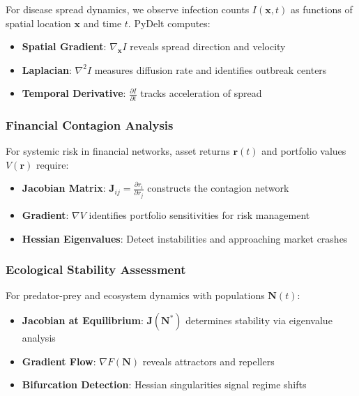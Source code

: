 \documentclass[10pt,journal,compsoc]{IEEEtran}
\begin{document}
For disease spread dynamics, we observe infection counts $I(\mathbf{x}, t)$ as functions of spatial location $\mathbf{x}$ and time $t$. PyDelt computes:

\begin{itemize}
    \item \textbf{Spatial Gradient}: $\nabla_{\mathbf{x}} I$ reveals spread direction and velocity
    \item \textbf{Laplacian}: $\nabla^2 I$ measures diffusion rate and identifies outbreak centers
    \item \textbf{Temporal Derivative}: $\frac{\partial I}{\partial t}$ tracks acceleration of spread
\end{itemize}

\subsubsection{Financial Contagion Analysis}

For systemic risk in financial networks, asset returns $\mathbf{r}(t)$ and portfolio values $V(\mathbf{r})$ require:

\begin{itemize}
    \item \textbf{Jacobian Matrix}: $\mathbf{J}_{ij} = \frac{\partial r_i}{\partial r_j}$ constructs the contagion network
    \item \textbf{Gradient}: $\nabla V$ identifies portfolio sensitivities for risk management
    \item \textbf{Hessian Eigenvalues}: Detect instabilities and approaching market crashes
\end{itemize}

\subsubsection{Ecological Stability Assessment}

For predator-prey and ecosystem dynamics with populations $\mathbf{N}(t)$:

\begin{itemize}
    \item \textbf{Jacobian at Equilibrium}: $\mathbf{J}(\mathbf{N}^*)$ determines stability via eigenvalue analysis
    \item \textbf{Gradient Flow}: $\nabla F(\mathbf{N})$ reveals attractors and repellers
    \item \textbf{Bifurcation Detection}: Hessian singularities signal regime shifts
\end{itemize}
\end{document}
